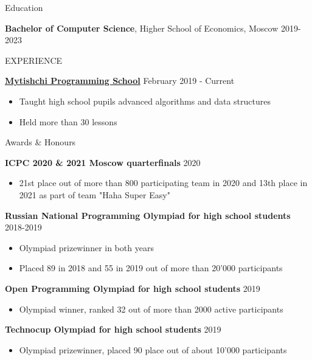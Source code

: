 \documentclass{resume} %
\begin{document}
\begin{rSection}{Education}

{\bf Bachelor of Computer Science}, Higher School of Economics, Moscow \hfill {2019-2023}

\end{rSection}


\begin{rSection}{EXPERIENCE}

\textbf{\href{https://informatics.ru/about-us/}{Mytishchi Programming School}} \hfill February 2019 - Current
 \begin{itemize}
    \itemsep -3pt {} 
     \item Taught high school pupils advanced algorithms and data structures
     \item Held more than 30 lessons
 \end{itemize}
 

\end{rSection} 

\begin{rSection}{Awards \& Honours}

\textbf{ICPC 2020  \& 2021 Moscow quarterfinals} \hfill 2020
 \begin{itemize}
    \itemsep -3pt {} 
        \item 21st place out of more than 800 participating team in 2020 and 13th place in 2021 as part of team "Haha Super Easy" 
 \end{itemize}
 
\textbf{Russian National Programming Olympiad for high school students} \hfill 2018-2019
 \begin{itemize}
    \itemsep -3pt {} 
        \item Olympiad prizewinner in both years
     \item Placed 89 in 2018 and 55 in 2019 out of more than 20'000 participants
 \end{itemize}

\textbf{Open Programming Olympiad for high school students} \hfill 2019
 \begin{itemize}
    \itemsep -3pt {} 
        \item Olympiad winner, ranked 32 out of more than 2000 active participants
 \end{itemize}

\textbf{Technocup Olympiad for high school students} \hfill 2019
 \begin{itemize}
    \itemsep -3pt {} 
        \item Olympiad prizewinner, placed 90 place out of about 10'000 participants
 \end{itemize}

\end{rSection}
\end{document}
